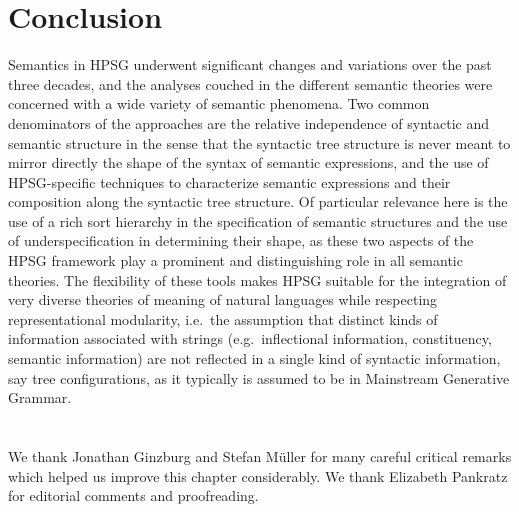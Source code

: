\documentclass[output=paper
 	        ,biblatex
                ,babelshorthands
                ,newtxmath
                ,draftmode
                ,colorlinks, citecolor=brown
]{langscibook}
\begin{document}
\section{Conclusion}

Semantics in HPSG underwent significant changes and variations over the past three decades, and the analyses couched in the different semantic theories were concerned with a wide variety of semantic phenomena. Two common denominators of the approaches are the relative independence of syntactic and
 semantic structure in the sense that the syntactic tree structure is never meant to mirror directly the shape of the syntax of semantic expressions, and the use of HPSG-specific techniques to characterize semantic expressions and their composition along the syntactic tree structure. Of particular relevance here is the use of a rich sort hierarchy in the specification of semantic structures and the use of underspecification in determining their shape, as these two aspects of the HPSG framework play a prominent and distinguishing role in all semantic theories. The flexibility of these tools makes HPSG suitable for the integration of very diverse theories of meaning of natural languages while respecting representational modularity, i.e.\ the 
assumption that 
 distinct kinds of information associated with strings (e.g.\ inflectional information, constituency, semantic information) are not reflected in a single kind of syntactic information, say tree configurations, as it typically is assumed to be in Mainstream Generative Grammar.


\section*{\acknowledgmentsUS}

We thank Jonathan Ginzburg and Stefan Müller for many careful critical remarks which helped
us improve this chapter considerably. We thank
Elizabeth Pankratz for editorial comments and proofreading.


{\sloppy
\printbibliography[heading=subbibliography,notkeyword=this] 
}
\end{document}
